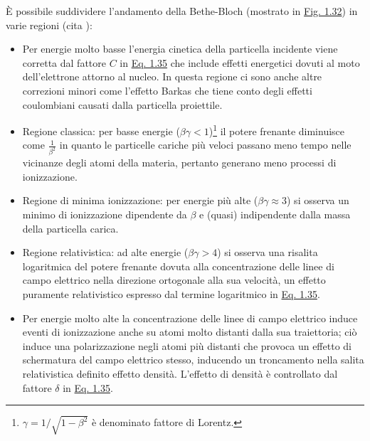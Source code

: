 \documentclass[12pt,a4paper,twoside]{report}
\begin{document}
	\`E possibile suddividere l'andamento della Bethe-Bloch (mostrato in \hyperref[fig:bethe_bloch]{Fig. 1.32}) in varie regioni (cita
	):
	\begin{itemize}
		\item Per energie molto basse l'energia cinetica della particella incidente viene corretta dal fattore $C$ in \hyperref[eq:bethe_bloch]{Eq. 1.35} che include effetti energetici dovuti al moto dell'elettrone attorno al nucleo. In questa regione ci sono anche altre correzioni minori come l'effetto Barkas che tiene conto degli effetti coulombiani causati dalla particella proiettile.
		\item Regione classica: per basse energie ($\beta\gamma<1$)\footnote{$\gamma=1/\sqrt{1-\beta^2}$ è denominato fattore di Lorentz.} il potere frenante diminuisce come $\frac{1}{\beta^2}$ in quanto le particelle cariche più veloci passano meno tempo nelle vicinanze degli atomi della materia, pertanto generano meno processi di ionizzazione.
		\item Regione di minima ionizzazione: per energie più alte ($\beta\gamma\approx3$) si osserva un minimo di ionizzazione dipendente da $\beta$ e (quasi) indipendente dalla massa della particella carica.
		\item Regione relativistica: ad alte energie ($\beta\gamma>4$) si osserva una risalita logaritmica del potere frenante dovuta alla concentrazione delle linee di campo elettrico nella direzione ortogonale alla sua velocità, un effetto puramente relativistico espresso dal termine logaritmico in \hyperref[eq:bethe_bloch]{Eq. 1.35}.
		\item Per energie molto alte la concentrazione delle linee di campo elettrico induce eventi di ionizzazione anche su atomi molto distanti dalla sua traiettoria; ciò induce una polarizzazione negli atomi più distanti che provoca un effetto di schermatura del campo elettrico stesso, inducendo un troncamento nella salita relativistica definito effetto densità. L'effetto di densità è controllato dal fattore $\delta$ in \hyperref[eq:bethe_bloch]{Eq. 1.35}.
	\end{itemize}
\end{document}
